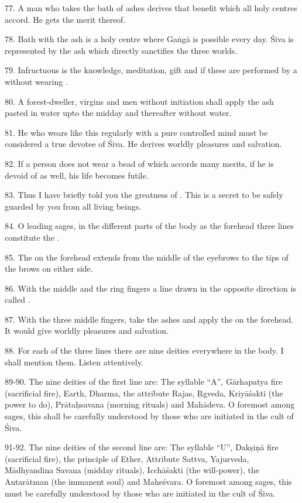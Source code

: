 77. A man who takes the bath of ashes derives that benefit which all holy
centres accord. He gets the merit thereof.

78. Bath with the ash is a holy centre where Gaṅgā  is possible every
day. Śiva is represented by the ash which directly sanctifies the three worlds.

79. Infructuous is the knowledge, meditation, gift and  if these are
performed by a  without wearing .

80. A forest-dweller, virgins and men without initiation shall apply the ash
pasted in water upto the midday and thereafter without water.

81. He who wears  like this regularly with a pure controlled mind
must be considered a true devotee of Śiva. He derives worldly pleasures and
salvation.

82. If a person does not wear a bead of  which accords many merits,
if he is devoid of  as well, his life becomes futile.

83. Thus I have briefly told you the greatness of . This is a
secret to be safely guarded by you from all living beings.

84. O leading sages, in the different parts of the body as the forehead \etc
three lines constitute the .

85. The  on the forehead extends from the middle of the eyebrows
to the tips of the brows on either side.

86. With the middle and the ring fingers a line drawn in the opposite direction
is called .

87. With the three middle fingers, take the ashes and apply the 
on the forehead. It would give worldly pleasures and salvation.

88. For each of the three lines there are nine deities everywhere in the body.
I shall mention them. Listen attentively.

89-90. The nine deities of the first line are: The syllable “A”, Gārhapatya fire
(sacrificial fire), Earth, Dharma, the attribute Rajas, Ṛgveda, Kriyāśakti
(the power to do), Prātaḥsavana (morning rituals) and Mahādeva. O foremost among
sages, this shall be carefully understood by those who are initiated in the cult
of Śiva.

91-92. The nine deities of the second line are: The syllable “U”, Dakṣiṇā fire
(sacrificial fire), the principle of Ether, Attribute Sattva, Yajurveda,
Mādhyandina Savana (midday rituals), Icchāśakti (the will-power), the Antarātman
(the immanent soul) and Maheśvara. O foremost among sages, this must be
carefully understood by those who are initiated in the cult of Śiva.

